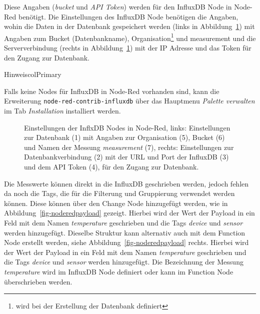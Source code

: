 \documentclass[
  11pt,
  a4paper,
  oneside, openany  ,captions=tableheading
]{scrbook}
\theoremstyle{remark}
\begin{document}
Diese Angaben (\emph{bucket} und \emph{API Token}) werden für den
InfluxDB Node in Node-Red benötigt. Die Einstellungen des InfluxDB Node
benötigen die Angaben, wohin die Daten in der Datenbank gespeichert
werden (links in Abbildung~\ref{fig-noderedinfluxdb}) mit Angaben zum
Bucket (Datenbankname), Organisation\footnote{wird bei der Erstellung
  der Datenbank definiert} und measurement und die Serververbindung
(rechts in Abbildung~\ref{fig-noderedinfluxdb}) mit der IP Adresse und
das Token für den Zugang zur Datenbank.

\begin{boxtitle}{Hinweis}{colPrimary}

Falls keine Nodes für InfluxDB in Node-Red vorhanden sind, kann die
Erweiterung \texttt{node-red-contrib-influxdb} über das Hauptmenu
\emph{Palette verwalten} im Tab \emph{Installation} installiert werden.

\end{boxtitle}

\begin{figure}


\caption{\label{fig-noderedinfluxdb}Einstellungen der InflxDB Nodes in
Node-Red, links: Einstellungen zur Datenbank (1) mit Angaben zur
Organisation (5), Bucket (6) und Namen der Messung \emph{measurement}
(7), rechts: Einstellungen zur Datenbankverbindung (2) mit der URL und
Port der InfluxDB (3) und dem API Token (4), für den Zugang zur
Datenbank.}

\end{figure}%

Die Messwerte können direkt in die InfluxDB geschrieben werden, jedoch
fehlen da noch die Tags, die für die Filterung und Gruppierung verwendet
werden können. Diese können über den Change Node hinzugefügt werden, wie
in Abbildung~\ref{fig-noderedpayload} gezeigt. Hierbei wird der Wert der
Payload in ein Feld mit dem Namen \emph{temperature} geschrieben und die
Tags \emph{device} und \emph{sensor} werden hinzugefügt. Dieselbe
Struktur kann alternativ auch mit dem Function Node erstellt werden,
siehe Abbildung~\ref{fig-noderedpayload} rechts. Hierbei wird der Wert
der Payload in ein Feld mit dem Namen \emph{temperature} geschrieben und
die Tags \emph{device} und \emph{sensor} werden hinzugefügt. Die
Bezeichnung der Messung \emph{temperature} wird im InfluxDB Node
definiert oder kann im Function Node überschrieben werden.
\end{document}
